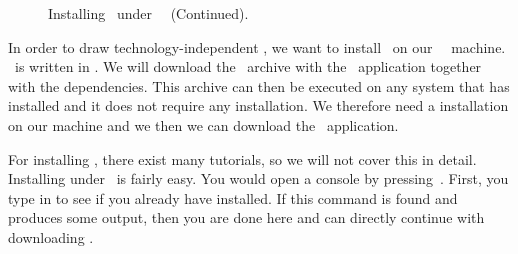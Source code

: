 %
\begin{figure}%
\ContinuedFloat%
\centering%
%
%
%
\floatSep%
%
%
%
\floatRowSep%
%
%
%
\floatSep%
%
%
%
\floatRowSep%
%
%
%
\caption{Installing \yEd\ under \ubuntu\ \linux~(Continued).}%
\label{fig:installYedUbuntu:C}%
\end{figure}%
%
In order to draw technology-independent , we want to install \yEd\ on our \ubuntu\ \linux\ machine.
\yEd\ is written in .
We will download the  ~archive with the \yEd\ application together with the dependencies.
This archive can then be executed on any system that has  installed and it does not require any installation.
We therefore need a  installation on our machine and we then we can download the \yEd\ application.

For installing , there exist many tutorials, so we will not cover this in detail.
Installing  under \ubuntu\ is fairly easy.
You would open a console  by pressing~\ubuntuTerminal.
First, you type in  to see if you already have  installed.
If this command is found and produces some output, then you are done here and can directly continue with downloading \yEd.

